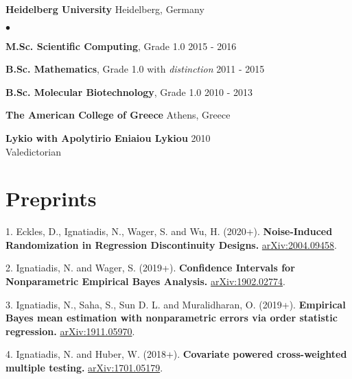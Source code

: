 \documentclass[margin,line]{res}
\newcommand{\g}{\textgreek}
\newenvironment{list1}{
  \begin{list}{\ding{113}}{%
      \setlength{\itemsep}{0in}
      \setlength{\parsep}{0in} \setlength{\parskip}{0in}
      \setlength{\topsep}{0in} \setlength{\partopsep}{0in}
      \setlength{\leftmargin}{0.17in}}}{\end{list}}
\newenvironment{list2}{
  \begin{list}{$\bullet$}{%
      \setlength{\itemsep}{0in}
      \setlength{\parsep}{0in} \setlength{\parskip}{0in}
      \setlength{\topsep}{0in} \setlength{\partopsep}{0in}
      \setlength{\leftmargin}{0.2in}}}{\end{list}}
\begin{document}
\begin{resume}
\vspace*{-2.5mm}
{\bf {Heidelberg University}} \hfill  {Heidelberg, Germany}\\
\vspace*{-.14in}
\begin{list2}
\item \textbf{M.Sc. Scientific Computing}, Grade 1.0 \hfill 2015 - 2016
\item \textbf{B.Sc. Mathematics}, Grade 1.0 with \emph{distinction} \hfill 2011 - 2015
\item \textbf{B.Sc. Molecular Biotechnology}, Grade 1.0 \hfill 2010 - 2013
\end{list2}

\vspace*{-2.5mm}
{\bf {{The American College of Greece}}} \hfill  {Athens, Greece}\\
\vspace*{-.14in}
\begin{list1}
\item[]
\textbf{Lykio with Apolytirio Eniaiou Lykiou}  \hfill 2010\\
Valedictorian
\end{list1}


\section{\sc Preprints}
\begin{list1}
\item[1.] Eckles, D., Ignatiadis, N., Wager, S. and Wu, H.  (2020+). \textbf{Noise-Induced Randomization in Regression Discontinuity Designs.} \href{https://arxiv.org/abs/2004.09458}{arXiv:2004.09458}.
\item[2.] Ignatiadis, N. and Wager, S. (2019+). \textbf{Confidence Intervals for Nonparametric Empirical Bayes Analysis.} \href{https://arxiv.org/abs/1902.02774}{arXiv:1902.02774}.
\item[3.] Ignatiadis, N., Saha, S., Sun D. L. and Muralidharan, O. (2019+). \textbf{Empirical Bayes mean estimation with nonparametric errors via order statistic regression.} \href{https://arxiv.org/abs/1911.05970}{arXiv:1911.05970}.
\item[4.] Ignatiadis, N. and Huber, W. (2018+). \textbf{Covariate powered cross-weighted multiple testing.} \href{https://arxiv.org/abs/1701.05179}{arXiv:1701.05179}.
\end{list1}



\end{resume}
\end{document}
